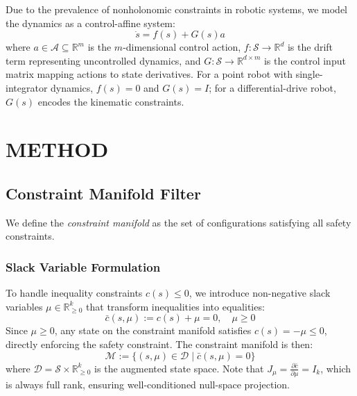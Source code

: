 \documentclass[letterpaper, 10 pt, conference]{ieeeconf}
\begin{document}
Due to the prevalence of nonholonomic constraints in robotic systems, we model the dynamics as a control-affine system:
\begin{equation}
    \dot{s} = f(s) + G(s) a
    \label{eq:dynamics}
\end{equation}
where $a \in \mathcal{A} \subseteq \mathbb{R}^m$ is the $m$-dimensional control action, $f: \mathcal{S} \rightarrow \mathbb{R}^d$ is the drift term representing uncontrolled dynamics, and $G: \mathcal{S} \rightarrow \mathbb{R}^{d \times m}$ is the control input matrix mapping actions to state derivatives. For a point robot with single-integrator dynamics, $f(s) = 0$ and $G(s) = I$; for a differential-drive robot, $G(s)$ encodes the kinematic constraints.

\section{METHOD}

\subsection{Constraint Manifold Filter}
\label{sec:manifold}

We define the \emph{constraint manifold} as the set of configurations satisfying all safety constraints.

\subsubsection{Slack Variable Formulation}

To handle inequality constraints $c(s) \leq 0$, we introduce non-negative slack variables $\mu \in \mathbb{R}^k_{\geq 0}$ that transform inequalities into equalities:
\begin{equation}
    \bar{c}(s, \mu) := c(s) + \mu = 0, \quad \mu \geq 0
    \label{eq:slack}
\end{equation}
Since $\mu \geq 0$, any state on the constraint manifold satisfies $c(s) = -\mu \leq 0$, directly enforcing the safety constraint. The constraint manifold is then:
\begin{equation}
    \mathcal{M} := \{ (s, \mu) \in \mathcal{D} \mid \bar{c}(s, \mu) = 0 \}
\end{equation}
where $\mathcal{D} = \mathcal{S} \times \mathbb{R}^k_{\geq 0}$ is the augmented state space. Note that $J_\mu = \frac{\partial \bar{c}}{\partial \mu} = I_k$, which is always full rank, ensuring well-conditioned null-space projection.
\end{document}
